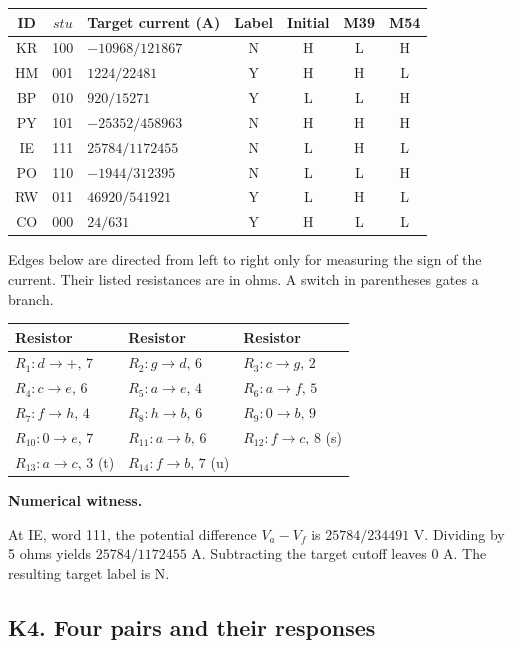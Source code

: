 \documentclass[12pt,letterpaper]{article}
\newcommand{\reading}[2]{\par\smallskip\textsf{\color{accent}\bfseries #1}\enspace #2\par}
\begin{document}
\begin{center}{\small\setlength{\tabcolsep}{4pt}\begin{tabularx}{\linewidth}{@{}ccYcccc@{}}\toprule
ID & $stu$ & Target current (A) & Label & Initial & M39 & M54\\\midrule
KR & 100 & $-10968/121867$ & N & H & L & H\\
HM & 001 & $1224/22481$ & Y & H & H & L\\
BP & 010 & $920/15271$ & Y & L & L & H\\
PY & 101 & $-25352/458963$ & N & H & H & H\\
IE & 111 & $25784/1172455$ & N & L & H & L\\
PO & 110 & $-1944/312395$ & N & L & L & H\\
RW & 011 & $46920/541921$ & Y & L & H & L\\
CO & 000 & $24/631$ & Y & H & L & L\\
\bottomrule\end{tabularx}}\end{center}

Edges below are directed from left to right only for measuring the sign of the current. Their listed resistances are in ohms. A switch in parentheses gates a branch.

\begin{center}{\footnotesize\setlength{\tabcolsep}{4pt}\begin{tabularx}{\linewidth}{@{}YYY@{}}\toprule
Resistor & Resistor & Resistor\\\midrule
$R_{1}: d\!\to\!+,\,7$ & $R_{2}: g\!\to\!d,\,6$ & $R_{3}: c\!\to\!g,\,2$\\
$R_{4}: c\!\to\!e,\,6$ & $R_{5}: a\!\to\!e,\,4$ & $R_{6}: a\!\to\!f,\,5$\\
$R_{7}: f\!\to\!h,\,4$ & $R_{8}: h\!\to\!b,\,6$ & $R_{9}: 0\!\to\!b,\,9$\\
$R_{10}: 0\!\to\!e,\,7$ & $R_{11}: a\!\to\!b,\,6$ & $R_{12}: f\!\to\!c,\,8$ (s)\\
$R_{13}: a\!\to\!c,\,3$ (t) & $R_{14}: f\!\to\!b,\,7$ (u) & \\
\bottomrule\end{tabularx}}\end{center}

\reading{Numerical witness.}{} At IE, word 111, the potential difference $V_{a}-V_{f}$ is $25784/234491$ V. Dividing by 5 ohms yields $25784/1172455$ A. Subtracting the target cutoff leaves $0$ A. The resulting target label is N.

\clearpage\subsection*{K4. Four pairs and their responses}
\end{document}
